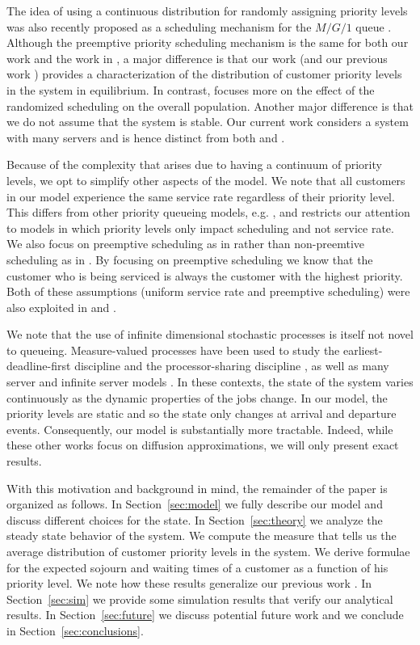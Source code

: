 \documentclass[conference]{IEEEtran}
\begin{document}
The idea of using a continuous distribution for randomly assigning
priority levels was also recently proposed as a scheduling mechanism
for the $M/G/1$ queue \cite{Haviv_2016}. Although the preemptive
priority scheduling mechanism is the same for both our work and the
work in \cite{Haviv_2016}, a major difference is that our work (and
our previous work \cite{Master_ACC_2017}) provides a characterization
of the distribution of customer priority levels in the system in
equilibrium. In contrast, \cite{Haviv_2016} focuses more on the effect
of the randomized scheduling on the overall population. Another major
difference is that we do not assume that the system is stable. Our
current work considers a system with many servers and is hence
distinct from both \cite{Master_ACC_2017} and \cite{Haviv_2016}.

Because of the complexity that arises due to having a continuum of
priority levels, we opt to simplify other aspects of the model.  We
note that all customers in our model experience the same service rate
regardless of their priority level. This differs from other priority
queueing models, e.g. \cite{Takacs_1964}, and restricts our attention
to models in which priority levels only impact scheduling and not
service rate. We also focus on preemptive scheduling as in
\cite{Chang_1965} rather than non-preemtive scheduling as in
\cite{Kapadia_1984}. By focusing on preemptive scheduling we know that
the customer who is being serviced is always the customer with the
highest priority. Both of these assumptions (uniform service rate and
preemptive scheduling) were also exploited in \cite{Master_ACC_2017}
and \cite{Haviv_2016}.

We note that the use of infinite dimensional stochastic processes is
itself not novel to queueing. Measure-valued processes have been used
to study the earliest-deadline-first discipline \cite{Doytchinov_2001}
and the processor-sharing discipline \cite{Gromoll_2004}, as well as
many server \cite{Kaspi_2013} and infinite server models
\cite{Reed_2015}. In these contexts, the state of the system varies
continuously as the dynamic properties of the jobs change. In our
model, the priority levels are static and so the state only changes at
arrival and departure events. Consequently, our model is substantially
more tractable. Indeed, while these other works focus on diffusion
approximations, we will only present exact results.

With this motivation and background in mind, the remainder of the
paper is organized as follows. In Section~\ref{sec:model} we fully
describe our model and discuss different choices for the state. In
Section~\ref{sec:theory} we analyze the steady state behavior of the
system. We compute the measure that tells us the average distribution
of customer priority levels in the system. We derive formulae for the
expected sojourn and waiting times of a customer as a function of his
priority level. We note how these results generalize our previous work
\cite{Master_ACC_2017}. In Section~\ref{sec:sim} we provide some
simulation results that verify our analytical results. In
Section~\ref{sec:future} we discuss potential future work and we
conclude in Section~\ref{sec:conclusions}.
\end{document}
